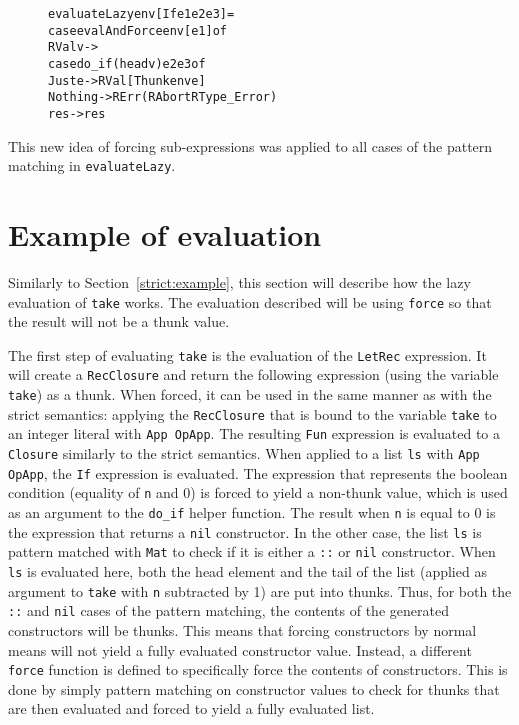 \begin{figure}[H]
\begin{alltt}
  evaluateLazy env [If e1 e2 e3]   =
    case evalAndForce env [e1] of
      RVal v ->
        case do_if (head v) e2 e3 of
          Just e  -> RVal [Thunk env e]
          Nothing -> RErr (RAbort RType_Error)
      res -> res
\end{alltt}
\end{figure}

This new idea of forcing sub-expressions was applied to all cases of the
pattern matching in \texttt{evaluateLazy}.

\section{Example of evaluation}
\label{lazy:example}
Similarly to Section~\ref{strict:example}, this section will describe how the
lazy evaluation of \texttt{take} works. The evaluation described will be using
\texttt{force} so that the result will not be a thunk value.

The first step of evaluating \texttt{take} is the evaluation of the
\texttt{LetRec} expression. It will create a \texttt{RecClosure} and return
the following expression (using the variable \texttt{take}) as a thunk.
When forced, it can be used in the same manner as with the strict semantics:
applying the \texttt{RecClosure} that is bound to the variable \texttt{take}
to an integer literal with \texttt{App OpApp}. The resulting \texttt{Fun}
expression is evaluated to a \texttt{Closure} similarly to the strict semantics.
When applied to a list \texttt{ls} with \texttt{App OpApp}, the \texttt{If}
expression is evaluated. The expression that represents the boolean condition
(equality of \texttt{n} and 0) is
forced to yield a non-thunk value, which is used as an argument to the
\texttt{do\_if} helper function. The result when \texttt{n} is equal to 0 is the
expression that returns a \texttt{nil} constructor. In the other case, the list
\texttt{ls} is pattern matched with \texttt{Mat} to check if it is either a
\texttt{::} or \texttt{nil} constructor. When \texttt{ls} is evaluated here,
both the head element and the tail of the list (applied as argument to
\texttt{take} with \texttt{n} subtracted by 1) are put into thunks. Thus, for
both the \texttt{::} and \texttt{nil} cases of the pattern matching, the contents
of the generated constructors will be thunks. This means
that forcing constructors by normal means will not yield
a fully evaluated constructor value. Instead, a different \texttt{force} function
is defined to specifically force the contents of constructors. This is done by
simply pattern matching on constructor values to check for thunks that are then
evaluated and forced to yield a fully evaluated list.



